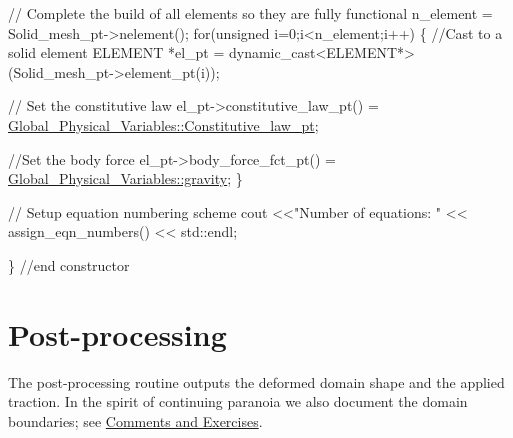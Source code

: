 \begin{DoxyCodeInclude}


 \textcolor{comment}{// Complete the build of all elements so they are fully functional}
 n\_element = Solid\_mesh\_pt->nelement();
 \textcolor{keywordflow}{for}(\textcolor{keywordtype}{unsigned} i=0;i<n\_element;i++)
  \{
   \textcolor{comment}{//Cast to a solid element}
   ELEMENT *el\_pt = \textcolor{keyword}{dynamic\_cast<}ELEMENT*\textcolor{keyword}{>}(Solid\_mesh\_pt->element\_pt(i));
   
   \textcolor{comment}{// Set the constitutive law}
   el\_pt->constitutive\_law\_pt() =
    \hyperlink{namespaceGlobal__Physical__Variables_a5d5f19442938130d36ee7476ae25049c}{Global\_Physical\_Variables::Constitutive\_law\_pt};
   
   \textcolor{comment}{//Set the body force}
   el\_pt->body\_force\_fct\_pt() = \hyperlink{namespaceGlobal__Physical__Variables_a0777aef63372db7f91ad894c38159681}{Global\_Physical\_Variables::gravity};
  \}
   
 \textcolor{comment}{// Setup equation numbering scheme}
 cout <<\textcolor{stringliteral}{"Number of equations: "} << assign\_eqn\_numbers() << std::endl; 
 
\} \textcolor{comment}{//end constructor}

\end{DoxyCodeInclude}




 

\hypertarget{index_doc}{}\section{Post-\/processing}\label{index_doc}
The post-\/processing routine outputs the deformed domain shape and the applied traction. In the spirit of continuing paranoia we also document the domain boundaries; see \hyperlink{index_comm_ex}{Comments and Exercises}.


